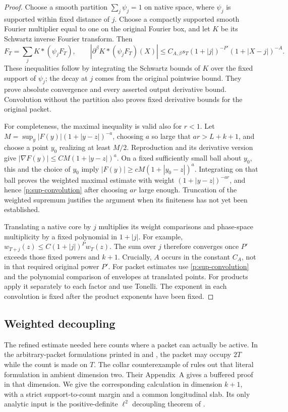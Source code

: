 \begin{proof}
Choose a smooth partition $\sum_j\psi_j=1$ on native space, where $\psi_j$ is
supported within fixed distance of $j$.  Choose a compactly supported smooth
Fourier multiplier equal to one on the original Fourier box, and let $K$ be
its Schwartz inverse Fourier transform.  Then
\[
 F_T=\sum_j K*(\psi_jF_T),\qquad
 |\partial^\beta K*(\psi_jF_T)(X)|
 \leq C_{A,\beta}s_T(1+|j|)^{-P'}(1+|X-j|)^{-A}.
\]
These inequalities follow by integrating the Schwartz bounds of $K$ over
the fixed support of $\psi_j$; the decay at $j$ comes from the original
pointwise bound.  They prove absolute convergence and every asserted
output derivative bound.  Convolution without the partition also proves
fixed derivative bounds for the original packet.

For completeness, the maximal inequality is valid also for $r<1$.
Let $M=\sup_y |F(y)|(1+|y-z|)^{-a}$, choosing $a$ so large that $ar>L+k+1$,
and choose a point $y_0$ realizing at least $M/2$.  Reproduction and its
derivative version give
$|\nabla F(y)|\leq C M(1+|y-z|)^a$.
On a fixed sufficiently small ball about $y_0$, this and the choice of
$y_0$ imply $|F(y)|\geq cM(1+|y_0-z|)^a$.
Integrating on that ball proves the weighted maximal estimate with weight
$(1+|y-z|)^{-ar}$, and hence \eqref{p:sup-convolution} after choosing $ar$
large enough.  Truncation of the weighted supremum justifies the argument
when its finiteness has not yet been established.

Translating a native core by $j$ multiplies its weight comparisons and
phase-space multiplicity by a fixed polynomial in $1+|j|$.  For example,
$w_{T+j}(z)\leq C(1+|j|)^Pw_T(z)$.  The sum over $j$ therefore converges
once $P'$ exceeds those fixed powers and $k+1$.  Crucially, $A$ occurs in the
constant $C_A$, not in that required original power $P'$.
For packet estimates use \eqref{p:sup-convolution} and the polynomial
comparison of envelopes at translated points.  For products apply it
separately to each factor and use Tonelli.  The exponent in each convolution
is fixed after the product exponents have been fixed.
\end{proof}

\subsection{Weighted decoupling}

The refined estimate needed here counts where a packet can actually be
active.  In the arbitrary-packet formulations printed in
\citet[Theorem~4.2]{GIOW2020} and
\citet[Theorem~4.2]{DIOWZ2021}, the packet may occupy $2T$ while the
count is made on $T$.  The collar counterexample of
\citet[Theorem~1.1]{SinghSinghParmar2026} rules out that literal
formulation in ambient dimension two.  Their Appendix~A gives a buffered
proof in that dimension.  We give the corresponding calculation in dimension $k+1$, with a
strict support-to-count margin and a common longitudinal slab.  Its only
analytic input is the positive-definite $\ell^2$ decoupling theorem of
\citet{BD2015}.

